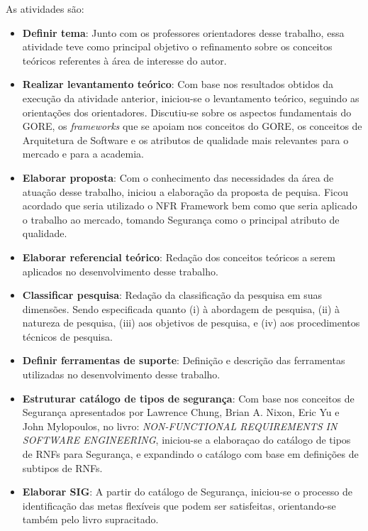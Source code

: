 As atividades são:

\begin{itemize}
	\item \textbf{Definir tema}: Junto com os professores orientadores desse trabalho, essa atividade teve como principal objetivo o refinamento sobre os conceitos teóricos referentes à área de interesse do autor.   
	
	\item \textbf{Realizar levantamento teórico}: Com base nos resultados obtidos da execução da atividade anterior, iniciou-se o levantamento teórico, seguindo as orientações dos orientadores. Discutiu-se sobre os aspectos fundamentais do GORE, os \textit{frameworks} que se apoiam nos conceitos do GORE, os conceitos de Arquitetura de Software e os atributos de qualidade mais relevantes para o mercado e para a academia. 
	
	\item \textbf{Elaborar proposta}: Com o conhecimento das necessidades da área de atuação desse trabalho, iniciou a elaboração da proposta de pequisa. Ficou acordado que seria utilizado o NFR Framework bem como que seria aplicado o trabalho ao mercado, tomando Segurança como o principal atributo de qualidade.  
	
	\item \textbf{Elaborar referencial teórico}: Redação dos conceitos teóricos a serem aplicados no desenvolvimento desse trabalho. 
	
	\item \textbf{Classificar pesquisa}: Redação  da classificação da pesquisa em suas dimensões. Sendo especificada quanto (i) à abordagem de pesquisa, (ii) à natureza de pesquisa, (iii) aos objetivos de pesquisa, e (iv) aos procedimentos técnicos de pesquisa.
	
	\item \textbf{Definir ferramentas de suporte}: Definição e descrição das ferramentas utilizadas no desenvolvimento desse trabalho.  
	
	\item \textbf{Estruturar catálogo de tipos de segurança}: Com base nos conceitos de Segurança apresentados por Lawrence Chung, Brian A. Nixon, Eric Yu e John Mylopoulos, no  livro: \textit{NON-FUNCTIONAL REQUIREMENTS
	IN SOFTWARE ENGINEERING}, iniciou-se a elaboraçao  do catálogo de tipos de RNFs para Segurança, e expandindo o catálogo com base em definições de subtipos de RNFs.
	
	\item \textbf{Elaborar SIG}: A partir do catálogo de Segurança, iniciou-se o processo de identificação das metas flexíveis que podem ser satisfeitas, orientando-se também pelo livro supracitado.
	

\end{itemize}
